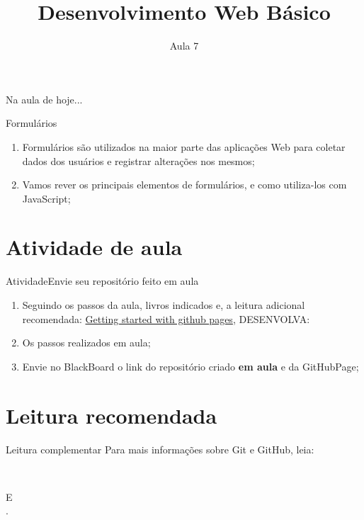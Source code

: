 \documentclass{beamer}
\title{Desenvolvimento Web Básico}
\subtitle{Aula 7}
\begin{document}
\frame{
 \titlepage
}

\begin{frame}{Na aula de hoje...} 
\tableofcontents 
\end{frame}
\begin{frame}{Formulários}
  \begin{enumerate}
      \item Formulários são utilizados na maior parte das aplicações Web para coletar dados dos usuários e registrar alterações nos mesmos;
      \item Vamos rever os principais elementos de formulários, e como utiliza-los com JavaScript;
  \end{enumerate}
\end{frame}
\section{Atividade de aula}
\begin{frame}{Atividade}{Envie seu repositório feito em aula}
  \begin{enumerate}
      \item Seguindo os passos da aula, livros indicados e, a leitura adicional recomendada: \textcolor{blue}{\href{https://docs.github.com/pt/pages/getting-started-with-github-pages/creating-a-github-pages-site}{Getting started with github pages}}, DESENVOLVA:
      \item Os passos realizados em aula;
      \item Envie no BlackBoard o link do repositório criado \textbf{em aula} e da GitHubPage;
  \end{enumerate}


\end{frame}
\section{Leitura recomendada}
\begin{frame}{Leitura complementar}
 Para mais informações sobre Git e GitHub, leia:\\
  \vspace{0.6cm}
 \begin{columns}
   \begin{column}{0.4\textwidth}
 \cite{githubpages2022}\\
 E\\
 \cite{beer2015github}.
   \end{column}
   \begin{column}{0.4\textwidth}
   \end{column}

 \end{columns}
\end{frame}
\end{document}

